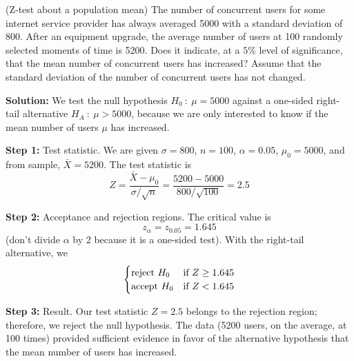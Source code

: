 \newpage

\begin{multicols}{2}
\setlength{\columnsep}{1.5cm}
\setlength{\columnseprule}{0.2pt}

\begin{example}{ (Z-test about a population mean)}
  The number of concurrent users for some internet service provider has always averaged 5000 with a standard deviation of 800. After an equipment upgrade, the average number of users at 100 randomly selected moments of time is 5200. Does it indicate, at a $5\%$ level of significance, that the mean number of concurrent users has increased? Assume that the standard deviation of the number of concurrent users has not changed.

  \textbf{Solution:}
  We test the null hypothesis $H_0\ :\ \mu = 5000$ against a one-sided right-tail alternative $H_A\ :\ \mu > 5000$, because we are only interested to know if the mean number of users $\mu$ has increased.

  \textbf{Step 1:} Test statistic. We are given $\sigma = 800$, $n = 100$, $\alpha = 0.05$, $\mu_0 = 5000$, and from sample, $\bar{X} = 5200$. The test statistic is
  \begin{equation*}
    Z = \frac{\bar{X} - \mu_0}{\sigma / \sqrt{n}} = \frac{5200 - 5000}{800 / \sqrt{100}} = 2.5
  \end{equation*}

  \textbf{Step 2:} Acceptance and rejection regions. The critical value is
  \begin{equation*}
    z_{\alpha} = z_{0.05} = 1.645
  \end{equation*}
  (don't divide $\alpha$ by 2 because it is a one-sided test). With the right-tail alternative, we
  \begin{equation*}
    \begin{cases}
      \textnormal{reject } H_0 &\textnormal{if } Z \geq 1.645\\
      \textnormal{accept } H_0 &\textnormal{if } Z < 1.645\\
    \end{cases}
  \end{equation*}

  \textbf{Step 3:} Result. Our test statistic $Z = 2.5$ belongs to the rejection region; therefore, we reject the null hypothesis. The data (5200 users, on the average, at 100 times) provided sufficient evidence in favor of the alternative hypothesis that the mean number of users has increased.
\end{example}


\end{multicols}
